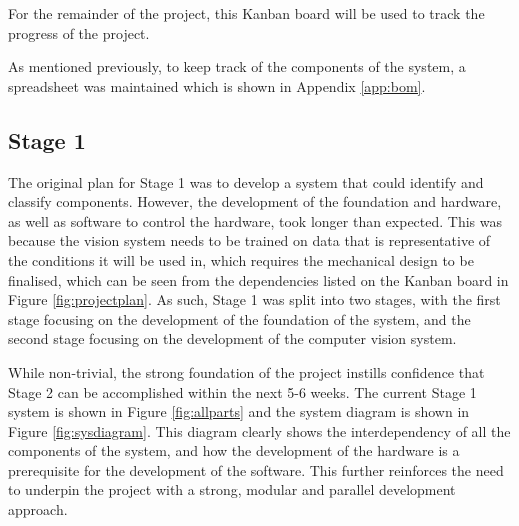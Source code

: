 For the remainder of the project, this Kanban board will be used to track the progress of the project. 

As mentioned previously, to keep track of the components of the system, a spreadsheet was maintained which is shown in Appendix \ref*{app:bom}.
\subsection{Stage 1}
The original plan for Stage 1 was to develop a system that could identify and classify components. However, the development 
of the foundation and hardware, as well as software to control the hardware, took longer than expected. This was because
the vision system needs to be trained on data that is representative of the conditions it will be used in, which 
requires the mechanical design to be finalised, which can be seen from the dependencies listed on the Kanban board in Figure \ref*{fig:projectplan}.
As such, Stage 1 was split into two stages, with the first stage focusing on the development of the foundation of the system, and the second stage focusing on the development of the computer vision system.

While non-trivial, the strong foundation of the project instills confidence that Stage 2 can be accomplished within the next 5-6 weeks.
The current Stage 1 system is shown in Figure \ref*{fig:allparts} and the system diagram is shown in Figure \ref*{fig:sysdiagram}.
This diagram clearly shows the interdependency of all the components of the system, and how the development of the hardware is a prerequisite for the development of the software.
This further reinforces the need to underpin the project with a strong, modular and parallel development approach.

